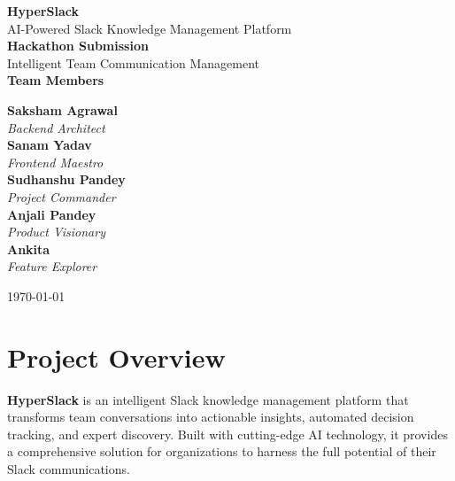 \documentclass[12pt,a4paper]{article}
\begin{document}
\begin{titlepage}
    \centering
    \vspace*{2cm}
    {\Huge\bfseries\color{primary} HyperSlack}\\[0.5cm]
    {\Large\color{secondary} AI-Powered Slack Knowledge Management Platform}\\[1cm]
    \vspace{1cm}
    {\large\bfseries Hackathon Submission}\\[0.5cm]
    {\large Intelligent Team Communication Management}\\[1.5cm]
    {\large\bfseries Team Members}\\[0.5cm]
    \vspace{1cm}
\begin{center}
\begin{tcolorbox}[colback=primary!5,colframe=primary!80!black,boxrule=1pt,arc=8pt,width=0.7\textwidth,center title,title=\textbf{\LARGE Our Team}]
    {\Large\textbf{Saksham Agrawal}} \\[-0.5ex]
    {\itshape Backend Architect} \\[1ex]
    {\Large\textbf{Sanam Yadav}} \\[-0.5ex]
    {\itshape Frontend Maestro} \\[1ex]
    {\Large\textbf{Sudhanshu Pandey}} \\[-0.5ex]
    {\itshape Project Commander} \\[1ex]
    {\Large\textbf{Anjali Pandey}} \\[-0.5ex]
    {\itshape Product Visionary} \\[1ex]
    {\Large\textbf{Ankita}} \\[-0.5ex]
    {\itshape Feature Explorer}
\end{tcolorbox}
\end{center}
\vspace{1cm}
    \vfill
    {\large \today}
\end{titlepage}

\tableofcontents
\newpage
\section{Project Overview}
\textbf{HyperSlack} is an intelligent Slack knowledge management platform that transforms team conversations into actionable insights, automated decision tracking, and expert discovery. Built with cutting-edge AI technology, it provides a comprehensive solution for organizations to harness the full potential of their Slack communications.
\end{document}
